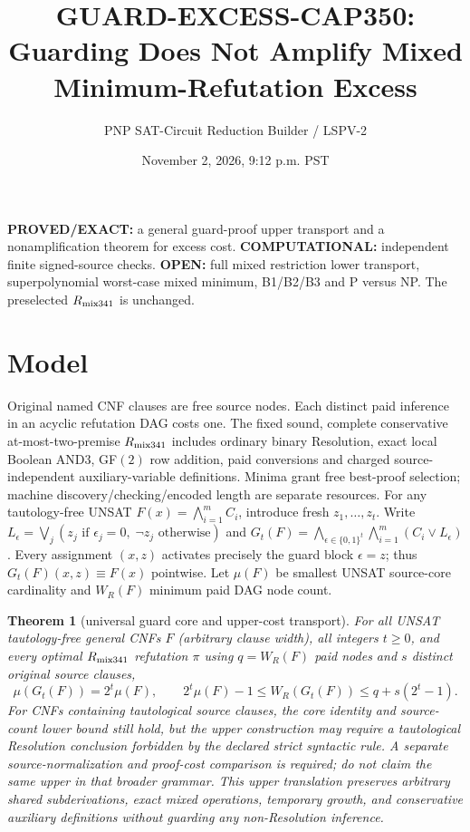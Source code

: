 \documentclass[11pt]{article}
\title{GUARD-EXCESS-CAP350: Guarding Does Not Amplify Mixed Minimum-Refutation Excess}
\author{PNP SAT-Circuit Reduction Builder / LSPV-2}
\date{November 2, 2026, 9:12 p.m. PST}
\newtheorem{theorem}{Theorem}
\begin{document}
\maketitle
\noindent\textbf{PROVED/EXACT:} a general guard-proof upper transport and a nonamplification theorem for excess cost. \textbf{COMPUTATIONAL:} independent finite signed-source checks. \textbf{OPEN:} full mixed restriction lower transport, superpolynomial worst-case mixed minimum, B1/B2/B3 and P versus NP. The preselected $R_{\rm mix341}$ is unchanged.
\section*{Model}
Original named CNF clauses are free source nodes. Each distinct paid inference in an acyclic refutation DAG costs one. The fixed sound, complete conservative at-most-two-premise $R_{\rm mix341}$ includes ordinary binary Resolution, exact local Boolean AND3, GF$(2)$ row addition, paid conversions and charged source-independent auxiliary-variable definitions. Minima grant free best-proof selection; machine discovery/checking/encoded length are separate resources.
For any tautology-free UNSAT $F(x)=\bigwedge_{i=1}^m C_i$, introduce fresh $z_1,\ldots,z_t$. Write $L_\epsilon=\bigvee_j(z_j\text{ if }\epsilon_j=0,\;\neg z_j\text{ otherwise})$ and $G_t(F)=\bigwedge_{\epsilon\in\{0,1\}^t}\bigwedge_{i=1}^m(C_i\vee L_\epsilon)$. Every assignment $(x,z)$ activates precisely the guard block $\epsilon=z$; thus $G_t(F)(x,z)\equiv F(x)$ pointwise. Let $\mu(F)$ be smallest UNSAT source-core cardinality and $W_R(F)$ minimum paid DAG node count.
\begin{theorem}[universal guard core and upper-cost transport]
For all UNSAT tautology-free general CNFs $F$ (arbitrary clause width), all integers $t\ge0$, and every optimal $R_{\rm mix341}$ refutation $\pi$ using $q=W_R(F)$ paid nodes and $s$ distinct original source clauses,
\[
\boxed{\mu(G_t(F))=2^t\mu(F),\qquad
2^t\mu(F)-1\le W_R(G_t(F))\le q+s(2^t-1).}
\]
For CNFs containing tautological source clauses, the core identity and source-count lower bound still hold, but the upper construction may require a tautological Resolution conclusion forbidden by the declared strict syntactic rule. A separate source-normalization and proof-cost comparison is required; do not claim the same upper in that broader grammar. This upper translation preserves arbitrary shared subderivations, exact mixed operations, temporary growth, and conservative auxiliary definitions without guarding any non-Resolution inference.
\end{theorem}
\end{document}
